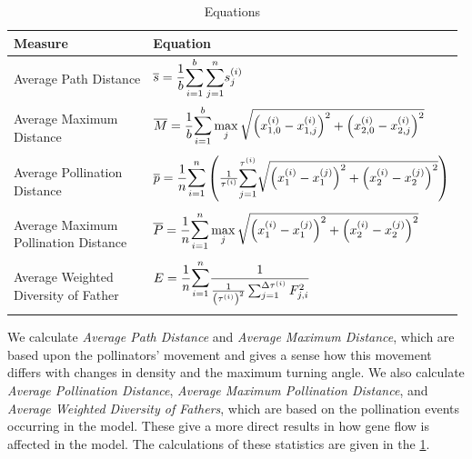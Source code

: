 \begin{table}[h]
  \centering
\setlength{\extrarowheight}{15pt}
\begin{tabular}{|l|l|}
  \hline
  Measure & Equation \\ \hline   \hline
  Average Path Distance & $\bar{s} = \dfrac{1}{b} \nsum\limits_{i=1}^b\,
    \nsum\limits_{j=1}^n s^{\left(i\right)}_j$ \\ \hline
  \multirow{2}{*}{\parbox{0.2\textwidth}{Average Maximum \\ Distance}} &
    $\bar{M} = \dfrac{1}{b} \nnsum_{i=1}^b \max\limits_j
        \sqrt{\left(x^{\left(i\right)}_{1,0} - x^{\left(i\right)}_{1,j}\right)^2
          + \left(x^{\left(i\right)}_{2,0} - x^{\left(i\right)}_{2,j}\right)^2}$
    \\ & \\ \hline
  \multirow{2}{*}{\parbox{0.2\textwidth}{Average Pollination \\ Distance}} &
    $\bar{p} = \dfrac{1}{n} \nnsum_{i=1}^{n}
        \left(\frac{1}{\tau^{\left(i\right)}} \nsum_{j=1}^{\tau^{\left(i\right)}}
            \sqrt{\left(x^{\left(i\right)}_1 - x^{\left(j\right)}_1\right)^2
            + \left(x^{\left(i\right)}_2 - x^{\left(j\right)}_2\right)^2}
        \right)$ \\ & \\ \hline
  \multirow{2}{*}{\parbox{0.2\textwidth}{Average Maximum \\
      Pollination Distance}} &
    $\bar{P} = \dfrac{1}{n} \nnsum_{i=1}^{n} \max\limits_j
      \sqrt{\left(x^{\left(i\right)}_1 - x^{\left(j\right)}_1\right)^2
        + \left(x^{\left(i\right)}_2 - x^{\left(j\right)}_2\right)^2}$ \\ & \\ \hline
  \multirow{2}{*}{\parbox{0.2\textwidth}{Average Weighted \\ Diversity of
      Father}} &
    $E = \dfrac{1}{n} \nnsum_{i=1}^n
      \dfrac{1}{\frac{1}{\left(\tau^{\left(i\right)}\right)^2}
      \sum_{j=1}^{\Delta\tau^{\left(i\right)}} F^2_{j,i}}$ \\ & \\ \hline
\end{tabular}
\caption{Equations}
\label{tab:eqn}
\end{table}

We calculate \emph{Average Path Distance} and \emph{Average Maximum Distance},
which are based upon the pollinators' movement and gives a sense how this
movement differs with changes in density and the maximum turning angle.  We also
calculate \emph{Average Pollination Distance}, \emph{Average Maximum Pollination
Distance}, and \emph{Average Weighted Diversity of Fathers}, which are based on
the pollination events occurring in the model.  These give a more direct results
in how gene flow is affected in the model.  The calculations of these statistics
are given in the \cref{tab:eqn}.

